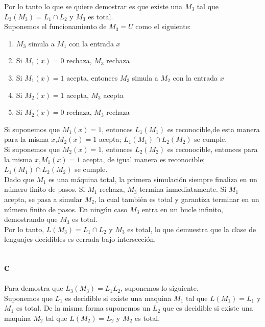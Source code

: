 Por lo tanto lo que se quiere demostrar es que existe una $M_3$ tal que $L_3(M_3) = L_1 \cap L_2$ y $M_3$ es total.\\

Suponemos el funcionamiento de $M_3 = U$ como el siguiente:
\begin{enumerate}
\item $M_3$ simula a $M_1$ con la entrada $x$
\item Si $M_1(x) = 0$ rechaza, $M_3$ rechaza 
\item Si $M_1(x) = 1$ acepta, entonces $M_3$ simula a $M_2$ con la entrada $x$
\item Si $M_2(x) = 1$ acepta, $M_3$ acepta
\item Si $M_2(x) = 0$ rechaza, $M_3$ rechaza 
\end{enumerate}

Si suponemos que $M_1(x)=1$, entonces $L_1(M_1)$ es reconocible,de esta manera para la misma $x$,$M_2(x)=1$ acepta; $L_1(M_1) \cap L_2(M_2)$ se cumple.\\

Si suponemos que $M_2(x)=1$, entonces $L_2(M_2)$ es reconocible, entonces para la misma $x$,$M_1(x)=1$ acepta, de igual manera es reconocible; $L_1(M_1) \cap L_2(M_2)$ se cumple.\\

Dado que $M_1$ es una máquina total, la primera simulación siempre finaliza en un número finito de pasos. Si $M_1$ rechaza, $M_3$ termina inmediatamente. Si $M_1$ acepta, se pasa a simular $M_2$, la cual también es total y garantiza terminar en un número finito de pasos. En ningún caso $M_3$ entra en un bucle infinito, demostrando que $M_3$ es total.\\

Por lo tanto, $L(M_3) = L_1 \cap L_2$ y $M_3$ es total, lo que demuestra que la clase de lenguajes decidibles es cerrada bajo intersección.\\

\subsection*{c} 
Para demostra que $L_3(M_3)=L_1 L_2$, suponemos lo siguiente.\\

Suponemos que $L_1$ es decidible si existe una maquina $M_1$ tal que $L(M_1) = L_1$ y $M_1$ es total. De la misma forma suponemos un $L_2$ que es decidible si existe una maquina $M_2$ tal que $L(M_2) = L_2$ y $M_2$ es total.\\

